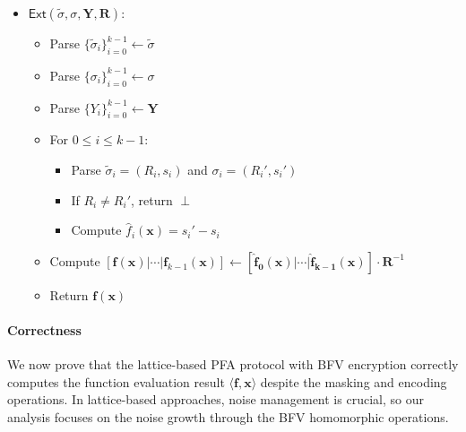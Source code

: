 \begin{itemize}
\item $\mathsf{Ext}(\widetilde{\sigma}, \sigma,\mathbf{Y},\mathbf{R})$:
   \begin{itemize}
       \item Parse $\{\widetilde{\sigma}_i\}_{i=0}^{k-1} \leftarrow \widetilde{\sigma}$
       \item Parse $\{\sigma_i\}_{i=0}^{k-1} \leftarrow \sigma$
       \item Parse $\{Y_i\}_{i=0}^{k-1} \leftarrow \mathbf{Y}$
       \item For $0\leq i\leq k-1$:
       \begin{itemize}
           \item Parse $\widetilde{\sigma}_i = (R_i,s_i)$ and $\sigma_i = (R_i',s_i')$
           \item If $R_i \neq R_i'$, return $\perp$
           \item Compute $\hat{f}_i(\mathbf{x}) = s_i' - s_i$
       \end{itemize}
       \item Compute $[\mathbf{f(x)}|\cdots|\mathbf{f}_{k-1}(\mathbf{x})]\leftarrow [\mathbf{\hat{f}_0}(\mathbf{x})|\cdots|\mathbf{\hat{f}_{k-1}}(\mathbf{x})]\cdot \mathbf{R}^{-1}$
       \item Return $\mathbf{f(x)}$
   \end{itemize}
\end{itemize}

\paragraph{Correctness}
We now prove that the lattice-based PFA protocol with BFV encryption correctly computes the function evaluation result $\langle \mathbf{f}, \mathbf{x} \rangle$ despite the masking and encoding operations. In lattice-based approaches, noise management is crucial, so our analysis focuses on the noise growth through the BFV homomorphic operations.

